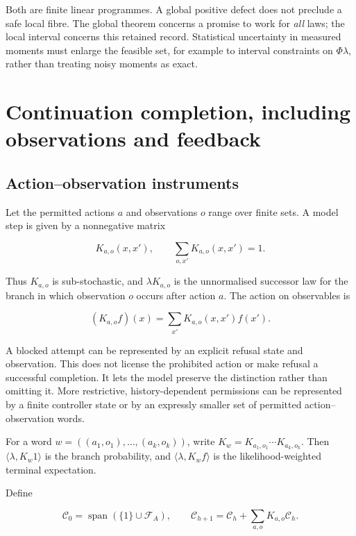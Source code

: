 \documentclass[11pt,a4paper]{article}
\begin{document}
Both are finite linear programmes. A global positive defect does not
preclude a safe local fibre. The global theorem concerns a promise to
work for \emph{all} laws; the local interval concerns this retained
record. Statistical uncertainty in measured moments must enlarge the
feasible set, for example to interval constraints on \(\Phi\lambda\),
rather than treating noisy moments as exact.

\section{Continuation completion, including observations and
feedback}\label{continuation-completion-including-observations-and-feedback}

\subsection{Action--observation
instruments}\label{actionobservation-instruments}

Let the permitted actions \(a\) and observations \(o\) range over finite
sets. A model step is given by a nonnegative matrix

\nopagebreak[4]

\[
K_{a,o}(x,x'),\qquad
\sum_{o,x'}K_{a,o}(x,x')=1.
\]

Thus \(K_{a,o}\) is sub-stochastic, and \(\lambda K_{a,o}\) is the
unnormalised successor law for the branch in which observation \(o\)
occurs after action \(a\). The action on observables is

\nopagebreak[4]

\[
(K_{a,o}f)(x)=\sum_{x'}K_{a,o}(x,x')f(x').
\]

A blocked attempt can be represented by an explicit refusal state and
observation. This does not license the prohibited action or make refusal
a successful completion. It lets the model preserve the distinction
rather than omitting it. More restrictive, history-dependent permissions
can be represented by a finite controller state or by an expressly
smaller set of permitted action--observation words.

For a word \(w=((a_1,o_1),\ldots,(a_k,o_k))\), write
\(K_w=K_{a_1,o_1}\cdots K_{a_k,o_k}\). Then
\(\langle\lambda,K_w1\rangle\) is the branch probability, and
\(\langle\lambda,K_wf\rangle\) is the likelihood-weighted terminal
expectation.

Define

\nopagebreak[4]

\[
\mathscr C_0=\operatorname{span}(\{1\}\cup\mathscr F_A),\qquad
\mathscr C_{h+1}=\mathscr C_h+
       \sum_{a,o}K_{a,o}\mathscr C_h.
\]
\end{document}

